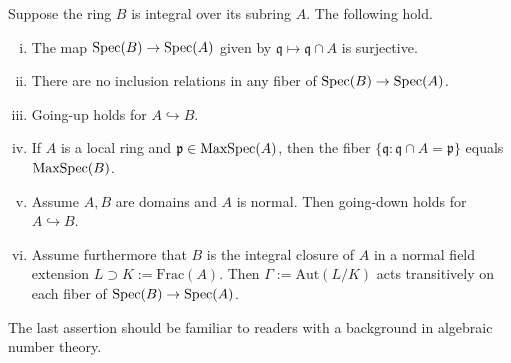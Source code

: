 \begin{theorem}\label{prop:Cohen-Seidenberg}
	Suppose the ring $B$ is integral over its subring $A$. The following hold.
	\begin{enumerate}[(i)]
		\item The map $\operatorname{Spec}(B) \to \operatorname{Spec}(A)$ given by $\mathfrak{q} \mapsto \mathfrak{q} \cap A$ is surjective.
		\item There are no inclusion relations in any fiber of $\operatorname{Spec}(B) \to \operatorname{Spec}(A)$.
		\item Going-up holds for $A \hookrightarrow B$.
		\item If $A$ is a local ring and $\mathfrak{p} \in \operatorname{MaxSpec}(A)$, then the fiber $\{ \mathfrak{q} : \mathfrak{q} \cap A = \mathfrak{p} \}$ equals $\operatorname{MaxSpec}(B)$.
		\item Assume $A,B$ are domains and $A$ is normal. Then going-down holds for $A \hookrightarrow B$.
		\item Assume furthermore that $B$ is the integral closure of $A$ in a normal field extension $L \supset K := \text{Frac}(A)$. Then $\Gamma := \text{Aut}(L/K)$ acts transitively on each fiber of $\operatorname{Spec}(B) \to \operatorname{Spec}(A)$.
	\end{enumerate}
\end{theorem}
The last assertion should be familiar to readers with a background in algebraic number theory.
